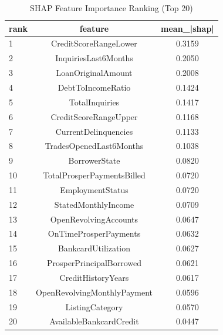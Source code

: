 \begin{table}
\centering
\caption{SHAP Feature Importance Ranking (Top 20)}
\label{tab:shap_ranking}
\begin{tabular}{lcc}
\toprule
rank & feature & mean_|shap| \\
\midrule
1 & CreditScoreRangeLower & 0.3159 \\
2 & InquiriesLast6Months & 0.2050 \\
3 & LoanOriginalAmount & 0.2008 \\
4 & DebtToIncomeRatio & 0.1424 \\
5 & TotalInquiries & 0.1417 \\
6 & CreditScoreRangeUpper & 0.1168 \\
7 & CurrentDelinquencies & 0.1133 \\
8 & TradesOpenedLast6Months & 0.1038 \\
9 & BorrowerState & 0.0820 \\
10 & TotalProsperPaymentsBilled & 0.0720 \\
11 & EmploymentStatus & 0.0720 \\
12 & StatedMonthlyIncome & 0.0709 \\
13 & OpenRevolvingAccounts & 0.0647 \\
14 & OnTimeProsperPayments & 0.0632 \\
15 & BankcardUtilization & 0.0627 \\
16 & ProsperPrincipalBorrowed & 0.0621 \\
17 & CreditHistoryYears & 0.0617 \\
18 & OpenRevolvingMonthlyPayment & 0.0596 \\
19 & ListingCategory & 0.0570 \\
20 & AvailableBankcardCredit & 0.0447 \\
\bottomrule
\end{tabular}
\end{table}
